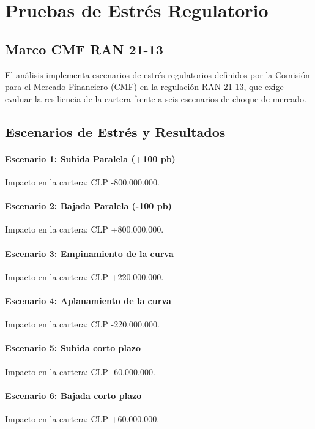 \documentclass[12pt,a4paper]{article}
\begin{document}
\section{Pruebas de Estrés Regulatorio}
\subsection{Marco CMF RAN 21-13}
El análisis implementa escenarios de estrés regulatorios definidos por la Comisión para el Mercado Financiero (CMF) en la regulación RAN 21-13, que exige evaluar la resiliencia de la cartera frente a seis escenarios de choque de mercado.

\subsection{Escenarios de Estrés y Resultados}
\paragraph{Escenario 1: Subida Paralela (+100 pb)}
Impacto en la cartera: CLP -800.000.000.

\paragraph{Escenario 2: Bajada Paralela (-100 pb)}
Impacto en la cartera: CLP +800.000.000.

\paragraph{Escenario 3: Empinamiento de la curva}
Impacto en la cartera: CLP +220.000.000.

\paragraph{Escenario 4: Aplanamiento de la curva}
Impacto en la cartera: CLP -220.000.000.

\paragraph{Escenario 5: Subida corto plazo}
Impacto en la cartera: CLP -60.000.000.

\paragraph{Escenario 6: Bajada corto plazo}
Impacto en la cartera: CLP +60.000.000.
\end{document}
